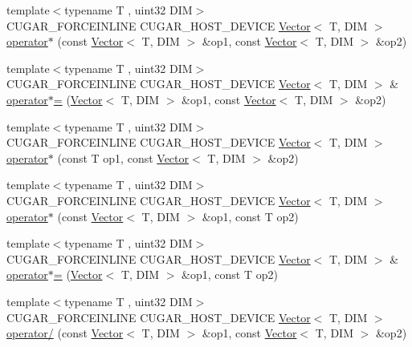 \begin{DoxyCompactItemize}
\item 
{\footnotesize template$<$typename T , uint32 D\+IM$>$ }\\C\+U\+G\+A\+R\+\_\+\+F\+O\+R\+C\+E\+I\+N\+L\+I\+NE C\+U\+G\+A\+R\+\_\+\+H\+O\+S\+T\+\_\+\+D\+E\+V\+I\+CE \hyperlink{structcugar_1_1_vector}{Vector}$<$ T, D\+IM $>$ \hyperlink{group___vectors_module_ga88fb5d3e63998e36fea6139b6d042b7e}{operator$\ast$} (const \hyperlink{structcugar_1_1_vector}{Vector}$<$ T, D\+IM $>$ \&op1, const \hyperlink{structcugar_1_1_vector}{Vector}$<$ T, D\+IM $>$ \&op2)
\item 
{\footnotesize template$<$typename T , uint32 D\+IM$>$ }\\C\+U\+G\+A\+R\+\_\+\+F\+O\+R\+C\+E\+I\+N\+L\+I\+NE C\+U\+G\+A\+R\+\_\+\+H\+O\+S\+T\+\_\+\+D\+E\+V\+I\+CE \hyperlink{structcugar_1_1_vector}{Vector}$<$ T, D\+IM $>$ \& \hyperlink{group___vectors_module_ga533de6fa3d06d8337631ef848e63a1a5}{operator$\ast$=} (\hyperlink{structcugar_1_1_vector}{Vector}$<$ T, D\+IM $>$ \&op1, const \hyperlink{structcugar_1_1_vector}{Vector}$<$ T, D\+IM $>$ \&op2)
\item 
{\footnotesize template$<$typename T , uint32 D\+IM$>$ }\\C\+U\+G\+A\+R\+\_\+\+F\+O\+R\+C\+E\+I\+N\+L\+I\+NE C\+U\+G\+A\+R\+\_\+\+H\+O\+S\+T\+\_\+\+D\+E\+V\+I\+CE \hyperlink{structcugar_1_1_vector}{Vector}$<$ T, D\+IM $>$ \hyperlink{group___vectors_module_ga72ffd716dd8896e1d565483f4ff96a51}{operator$\ast$} (const T op1, const \hyperlink{structcugar_1_1_vector}{Vector}$<$ T, D\+IM $>$ \&op2)
\item 
{\footnotesize template$<$typename T , uint32 D\+IM$>$ }\\C\+U\+G\+A\+R\+\_\+\+F\+O\+R\+C\+E\+I\+N\+L\+I\+NE C\+U\+G\+A\+R\+\_\+\+H\+O\+S\+T\+\_\+\+D\+E\+V\+I\+CE \hyperlink{structcugar_1_1_vector}{Vector}$<$ T, D\+IM $>$ \hyperlink{group___vectors_module_ga81f6bb4e3ffbaa260e0713f8891b8909}{operator$\ast$} (const \hyperlink{structcugar_1_1_vector}{Vector}$<$ T, D\+IM $>$ \&op1, const T op2)
\item 
{\footnotesize template$<$typename T , uint32 D\+IM$>$ }\\C\+U\+G\+A\+R\+\_\+\+F\+O\+R\+C\+E\+I\+N\+L\+I\+NE C\+U\+G\+A\+R\+\_\+\+H\+O\+S\+T\+\_\+\+D\+E\+V\+I\+CE \hyperlink{structcugar_1_1_vector}{Vector}$<$ T, D\+IM $>$ \& \hyperlink{group___vectors_module_ga382f555725b86158c670437a5a4d3043}{operator$\ast$=} (\hyperlink{structcugar_1_1_vector}{Vector}$<$ T, D\+IM $>$ \&op1, const T op2)
\item 
{\footnotesize template$<$typename T , uint32 D\+IM$>$ }\\C\+U\+G\+A\+R\+\_\+\+F\+O\+R\+C\+E\+I\+N\+L\+I\+NE C\+U\+G\+A\+R\+\_\+\+H\+O\+S\+T\+\_\+\+D\+E\+V\+I\+CE \hyperlink{structcugar_1_1_vector}{Vector}$<$ T, D\+IM $>$ \hyperlink{group___vectors_module_gae077be2185ca7f28e1fae4fc110a14bf}{operator/} (const \hyperlink{structcugar_1_1_vector}{Vector}$<$ T, D\+IM $>$ \&op1, const \hyperlink{structcugar_1_1_vector}{Vector}$<$ T, D\+IM $>$ \&op2)

\end{DoxyCompactItemize}
